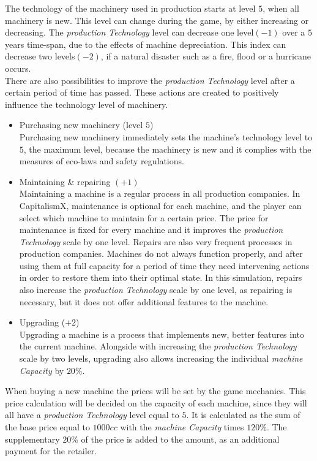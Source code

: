 The technology of the machinery used in production starts at level $5$, when all machinery is new. This level can change during the game, by either increasing or decreasing. The \textit{production Technology} level can decrease one level$(-1)$ over a $5$ years time-span, due to the effects of machine depreciation. This index can decrease two levels$(-2)$, if a natural disaster such as a fire, flood or a hurricane occurs.\\
There are also possibilities to improve the \textit{production Technology} level after a certain period of time has passed. These actions are created to  positively influence the technology level of machinery.
\begin{itemize}
    \item Purchasing new machinery (level $5$) \\
		Purchasing new machinery immediately sets the machine's technology level to $5$, the maximum level, because the machinery is new and it complies with the measures of eco-laws and safety regulations.
\item Maintaining \& repairing $(+1)$ \\
Maintaining a machine is a regular process in all production companies. In CapitalismX, maintenance is optional for each machine, and the player can select which machine to maintain for a certain price. The price for maintenance is fixed for every machine and it improves the \textit{production Technology} scale by one level. 
Repairs are also very frequent processes in production companies. Machines do not always function properly, and after using them at full capacity for a period of time they need intervening actions in order to restore them into their optimal state. In this simulation, repairs also increase the \textit{production Technology} scale by one level, as repairing is necessary, but it does not offer additional features to the machine.
\item Upgrading ($+2$) \\
Upgrading a machine is a process that implements new, better features into the current machine. Alongside with increasing the \textit{production Technology} scale by two levels, upgrading also allows increasing the individual \textit{machine Capacity} by $20\%$.
\end{itemize}
When buying a new machine the prices will be set by the game mechanics. This price calculation will be decided on the capacity of each machine, since they will all have a \textit{production Technology} level equal to $5$. It is calculated as the sum of the base price equal to $1000cc$ with the \textit{machine Capacity} times $120\%$.  The supplementary $20\%$ of the price is added to the amount, as an additional payment for the retailer.
